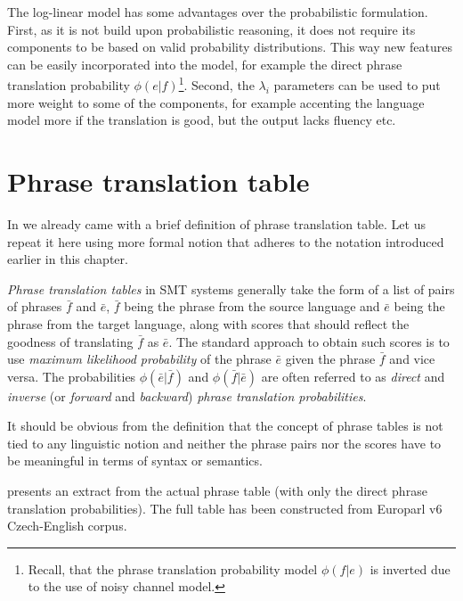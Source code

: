 The log-linear model has some advantages over the probabilistic formulation.
First, as it is not build upon probabilistic reasoning, it does not require its
components to be based on valid probability distributions.
This way new features can be easily incorporated into the model, for example the direct
phrase translation probability $\phi(e|f)$\footnote{Recall, that the phrase translation
probability model $\phi(f|e)$ is inverted due to the use of noisy channel model.}.
Second, the $\lambda_i$ parameters can be used to put more weight to some of the components,
for example accenting the language model more if the translation is good, but the output
lacks fluency etc.

\section{Phrase translation table}


In  we already came with a brief definition of phrase
translation table. Let us repeat it here using more formal notion that adheres
to the notation introduced earlier in this chapter.

\emph{Phrase translation tables} in SMT systems generally take the form of a list of
pairs of phrases $\bar{f}$ and $\bar{e}$, $\bar{f}$ being the phrase from the source
language and $\bar{e}$ being the phrase from the target language, along with scores
that should reflect the goodness of translating $\bar{f}$ as $\bar{e}$.
The standard approach to obtain such scores is to use \emph{maximum likelihood
probability} of the phrase $\bar{e}$ given the phrase $\bar{f}$ and vice versa.
The probabilities $\phi(\bar{e}|\bar{f})$ and $\phi(\bar{f}|\bar{e})$ are often
referred to as \emph{direct} and \emph{inverse} (or \emph{forward} and \emph{backward})
\emph{phrase translation probabilities}.

It should be obvious from the definition that the concept of phrase tables is not tied
to any linguistic notion and neither the phrase pairs nor the scores have to be meaningful
in terms of syntax or semantics.

 presents an extract from the actual phrase table
(with only the direct phrase translation probabilities).
The full table has been constructed from Europarl v6 Czech-English
corpus.

